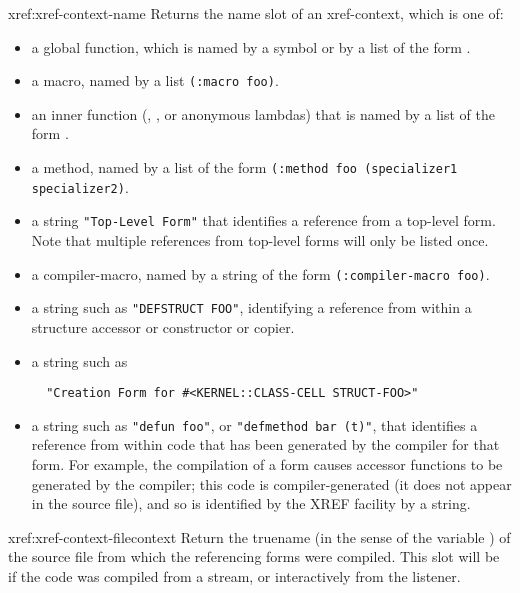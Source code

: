 \begin{defun}{xref:}{xref-context-name}{\args {}}
  Returns the name slot of an xref-context, which is one of:
\begin{itemize}
\item
a global function, which is named by a symbol or by a list of the form
. 

\item
a macro, named by a list \verb|(:macro foo)|.

\item
an inner function (, , or anonymous lambdas) that
is named by a list of the form .

\item
a method, named by a list of the form
\verb|(:method foo (specializer1 specializer2)|. 

\item
a string \verb|"Top-Level Form"| that identifies a reference from a
top-level form. Note that multiple references from top-level forms
will only be listed once. 

\item
a compiler-macro, named by a string of the form
\verb|(:compiler-macro foo)|. 

\item
a string such as \verb|"DEFSTRUCT FOO"|, identifying a reference from
within a structure accessor or constructor or copier.

\item
a string such as 
\begin{verbatim}
  "Creation Form for #<KERNEL::CLASS-CELL STRUCT-FOO>"
\end{verbatim}

\item
a string such as \verb|"defun foo"|, or \verb|"defmethod bar (t)"|,
that identifies a reference from within code that has been generated
by the compiler for that form. For example, the compilation of a
 form causes accessor functions to be generated by the
compiler; this code is compiler-generated (it does not appear in the
source file), and so is identified by the XREF facility by a string. 
\end{itemize}
\end{defun}


\begin{defun}{xref:}{xref-context-file}{context}
  Return the truename (in the sense of the variable
   ) of the source file from which the
   referencing forms were compiled. This slot will be \nil{} if the
   code was compiled from a stream, or interactively from the
   listener.
\end{defun}

